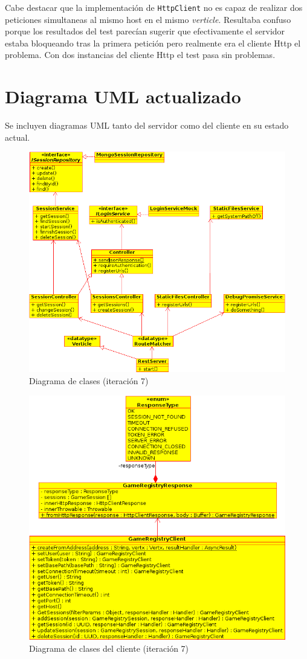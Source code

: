 Cabe destacar que la implementación de \texttt{HttpClient} no es capaz de realizar
dos peticiones simultaneas al mismo host en el mismo \emph{verticle}. Resultaba confuso 
porque los resultados del test parecían sugerir que efectivamente el servidor estaba 
bloqueando tras la primera petición pero realmente era el cliente Http el problema. 
Con dos instancias del cliente Http el test pasa sin problemas.


\section{Diagrama UML actualizado}

Se incluyen diagramas UML tanto del servidor como del cliente en su estado actual.

\begin{figure}[h]
 \includegraphics[scale=0.8]{diagrams/class_diagram_iter7.png}
 \caption{Diagrama de clases (iteración 7)}
 \label{fig:clases}
\end{figure} 

\begin{figure}[h]
 \includegraphics[scale=0.8]{diagrams/class_diagram_client_iter7.png}
 \caption{Diagrama de clases del cliente (iteración 7)}
 \label{fig:clases}
\end{figure} 

